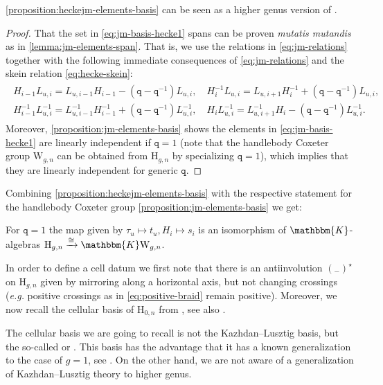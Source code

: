 \documentclass[a4paper,11pt]{amsart}
\let\emph\relax
\newcommand{\eg}{\textsl{e.g.}}
\newcommand{\muta}{\textsl{mutatis mutandis}}
\newcommand{\placeholder}{{}_{-}}
\newcommand{\setstuff}[1]{\mathrm{#1}}
\newcommand{\KK}{\mathbbm{K}}
\newcommand{\varsym}[1]{\mathtt{#1}}
\newcommand{\jm}{L}
\newcommand{\qvar}{\varsym{q}}
\numberwithin{equation}{section}
\let\fullref\autoref
\begin{document}
\fullref{proposition:heckejm-elements-basis} can be seen 
as a higher genus version of
\cite[Equation (3.10)]{ArKo-hecke-algebra}.

\begin{proof}
That the set in \eqref{eq:jm-basis-hecke1} spans can be proven {\muta} as 
in \fullref{lemma:jm-elements-span}. 
That is, we use the relations in \eqref{eq:jm-relations} 
together with the following immediate consequences 
of \eqref{eq:jm-relations} and the skein relation \eqref{eq:hecke-skein}:
\begin{gather}\label{eq:hecke-pull}
\begin{gathered}
H_{i-1}\jm_{u,i}
=
\jm_{u,i-1}H_{i-1}
-(\qvar-\qvar^{-1})\jm_{u,i}
,\quad
H_{i}^{-1}\jm_{u,i}
=
\jm_{u,i+1}H_{i}^{-1}
+(\qvar-\qvar^{-1})\jm_{u,i}
,\\
H_{i-1}^{-1}\jm_{u,i}^{-1}
=
\jm_{u,i-1}^{-1}H_{i-1}^{-1}
+(\qvar-\qvar^{-1})\jm_{u,i}^{-1}
,\quad
H_{i}\jm_{u,i}^{-1}
=
\jm_{u,i+1}^{-1}H_{i}
-(\qvar-\qvar^{-1})\jm_{u,i}^{-1}.
\end{gathered}
\end{gather}
Moreover, 
\fullref{proposition:jm-elements-basis} shows the elements in \eqref{eq:jm-basis-hecke1} are 
linearly independent if $\qvar=1$ 
(note that the handlebody Coxeter group $\setstuff{W}_{g,n}$
can be obtained from $\setstuff{H}_{g,n}$
by specializing $\qvar=1$), which implies that they are linearly independent for generic $\qvar$.
\end{proof}

Combining \fullref{proposition:heckejm-elements-basis} 
with the respective 
statement for the handlebody Coxeter 
group \fullref{proposition:jm-elements-basis} we get:

\begin{corollary}
For $\qvar=1$
the map given by
$\tau_{u}\mapsto t_{u},H_{i}\mapsto s_{i}$
is an isomorphism of $\KK$-algebras $\setstuff{H}_{g,n}\xrightarrow{\cong}\KK\setstuff{W}_{g,n}$.
\end{corollary}

In order to define a cell datum we first note that
there is an antiinvolution $(\placeholder)^{\star}$ 
on $\setstuff{H}_{g,n}$ given by mirroring along a horizontal 
axis, but not changing crossings ({\eg} positive crossings
as in \eqref{eq:positive-braid} remain positive).
Moreover, we now recall the 
cellular basis of $\setstuff{H}_{0,n}$ from \cite{Mu-typea-hecke}, see also \cite[Chapter 3]{Ma-hecke-schur}. 

\begin{remark}
The cellular basis we are going to recall is not the Kazhdan--Lusztig 
basis, but the so-called \emph{Murphy basis} or
\emph{standard basis}. This basis 
has the advantage that it has a known generalization to the case of $g=1$, 
see \cite{DiJaMa-cyclotomic-q-schur}. 
On the other hand, we are not aware of a generalization 
of Kazhdan--Lusztig theory to higher genus.
\end{remark}
\end{document}
